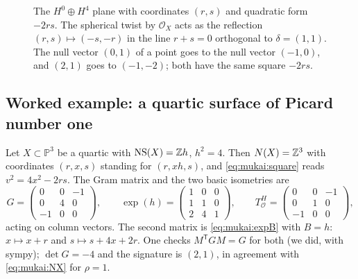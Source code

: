 \begin{figure}[ht]
\centering
{}
\caption{The $H^0\oplus H^4$ plane with coordinates $(r,s)$ and quadratic form $-2rs$. The
spherical twist by $\mathcal O_X$ acts as the reflection $(r,s)\mapsto(-s,-r)$ in the line
$r+s=0$ orthogonal to $\delta=(1,1)$. The null vector $(0,1)$ of a point goes to the null vector
$(-1,0)$, and $(2,1)$ goes to $(-1,-2)$; both have the same square $-2rs$.}
\label{fig:mukai:reflection}
\end{figure}

\subsection{Worked example: a quartic surface of Picard number one}\label{sec:mukai:quartic}
Let $X\subset\mathbb P^3$ be a quartic with $\operatorname{NS}(X)=\mathbb{Z} h$, $h^2=4$. Then
$N(X)=\mathbb{Z}^3$ with coordinates $(r,x,s)$ standing for $(r,xh,s)$, and \eqref{eq:mukai:square} reads
$v^2=4x^2-2rs$. The Gram matrix and the two basic isometries are
\[
  G=\begin{pmatrix}0&0&-1\\0&4&0\\-1&0&0\end{pmatrix},\qquad
  \exp(h)=\begin{pmatrix}1&0&0\\1&1&0\\2&4&1\end{pmatrix},\qquad
  T_{\mathcal O}^H=\begin{pmatrix}0&0&-1\\0&1&0\\-1&0&0\end{pmatrix},
\]
acting on column vectors. The second matrix is \eqref{eq:mukai:expB} with $B=h$: $x\mapsto x+r$
and $s\mapsto s+4x+2r$. One checks $M^{\mathsf T}GM=G$ for both (we did, with sympy); $\det G=-4$
and the signature is $(2,1)$, in agreement with \eqref{eq:mukai:NX} for $\rho=1$.

